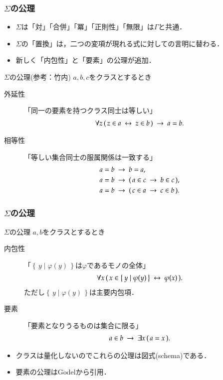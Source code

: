 \documentclass[dvipdfmx,10pt,notheorems]{beamer}
\theoremstyle{definition}
\newcommand{\Set}[2]{\left\{\, #1 \mid #2\, \right\}} %
\newcommand{\rarrow}{\hspace{0.25em}\rightarrow\hspace{0.25em}} %
\newcommand{\lrarrow}{\hspace{0.25em}\leftrightarrow\hspace{0.25em}} %
\begin{document}
\begin{frame}\frametitle{$\Sigma$の公理}
	\begin{itemize}
		\item $\Sigma$は「対」「合併」「冪」「正則性」「無限」は$\Gamma$と共通．
		\item $\Sigma$の「置換」は，二つの変項が現れる式に対しての言明に替わる．
		\item 新しく「内包性」と「要素」の公理が追加．
	\end{itemize}
	
	\begin{alertblock}{$\Sigma$の公理(参考：竹内\cite{TakeuchiSet})}
		$a,b,c$をクラスとするとき
		\begin{description}
			\item[外延性] 「同一の要素を持つクラス同士は等しい」
				\begin{align}
					\forall z\, (\, z \in a \lrarrow z \in b\, ) \rarrow a = b.
				\end{align}
			\item[相等性] 「等しい集合同士の服属関係は一致する」
				\begin{align}
					&a = b \rarrow b = a, \\
					&a = b \rarrow (\, a \in c \rarrow b \in c\, ), \\
					&a = b \rarrow (\, c \in a \rarrow c \in b\, ).
				\end{align}
		\end{description}	
	\end{alertblock}
\end{frame}

\begin{frame}\frametitle{$\Sigma$の公理}
	
	\begin{alertblock}{$\Sigma$の公理}
		$a,b$をクラスとするとき
		\begin{description}
			\item[内包性] 「$\Set{y}{\varphi(y)}$は$\varphi$であるモノの全体」
				\begin{align}
					\forall x\, (\, x \in \Set{y}{\varphi(y)} \lrarrow \varphi(x)\, ).
				\end{align}
				ただし$\Set{y}{\varphi(y)}$は主要内包項．
				
			\item[要素] 「要素となりうるものは集合に限る」
				\begin{align}
					a \in b \rarrow \exists x\, (\, a = x\, ).
				\end{align}
		\end{description}	
	\end{alertblock}
	
	\begin{itemize}	
		\item クラスは量化しないのでこれらの公理は図式(schema)である．	
		\item 要素の公理はG$\ddot{\mbox{o}}$del\cite{Godel}から引用．
	\end{itemize}
\end{frame}
\end{document}
